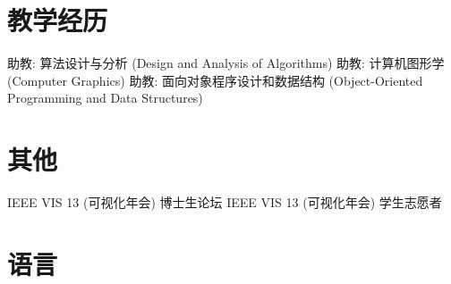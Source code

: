 \documentclass[10pt,a4paper,roman]{moderncv} %
\begin{document}
\section{教学经历}

 {助教: 算法设计与分析 (Design and Analysis of Algorithms)}
 {助教: 计算机图形学 (Computer Graphics)}
 {助教: 面向对象程序设计和数据结构 (Object-Oriented Programming and Data Structures)}


\clearpage

\section{其他}

\cvitem{} {IEEE VIS 13 (可视化年会) 博士生论坛}
\cvitem{} {IEEE VIS 13 (可视化年会) 学生志愿者}




\section{语言}



\clearpage
\end{document}

